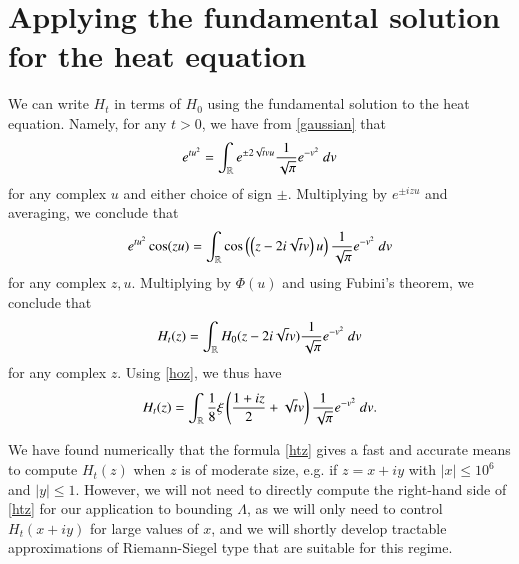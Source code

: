 \section{Applying the fundamental solution for the heat equation}\label{heatflow-sec}

We can write $H_t$ in terms of $H_0$ using the fundamental solution to the heat equation.  Namely, for any $t>0$, we have from \eqref{gaussian} that
$$
e^{tu^2} = \int_{\mathbb{R}} e^{\pm 2 \sqrt{t} vu} \frac{1}{\sqrt{\pi}} e^{-v^2}\ dv$$
for any complex $u$ and either choice of sign $\pm$. Multiplying by $e^{\pm i zu}$ and averaging, we conclude that
$$
e^{tu^2} \cos(zu) = \int_{\mathbb{R}} \cos\left(\left(z - 2 i \sqrt{t} v\right)u\right) \frac{1}{\sqrt{\pi}} e^{-v^2}\ dv$$
for any complex $z,u$.  Multiplying by $\Phi(u)$ and using Fubini's theorem, we conclude that
$$ H_t(z) = \int_{\mathbb{R}} H_0( z - 2i \sqrt{t} v ) \frac{1}{\sqrt{\pi}} e^{-v^2}\ dv $$
for any complex $z$.  Using \eqref{hoz}, we thus have
\begin{equation}\label{htz}
 H_t(z) = \int_{\mathbb{R}} \frac{1}{8} \xi\left( \frac{1+iz}{2} + \sqrt{t} v \right) \frac{1}{\sqrt{\pi}} e^{-v^2}\ dv.
\end{equation}

\begin{remark}  We have found numerically that the formula \eqref{htz} gives a fast and accurate means to compute $H_t(z)$ when $z$ is of moderate size, e.g. if $z = x+iy$ with $|x| \leq 10^6$ and $|y| \leq 1$.  However, we will not need to directly compute the right-hand side of \eqref{htz} for our application to bounding $\Lambda$, as we will only need to control $H_t(x+iy)$ for large values of $x$, and we will shortly develop tractable approximations of Riemann-Siegel type that are suitable for this regime.
\end{remark}

